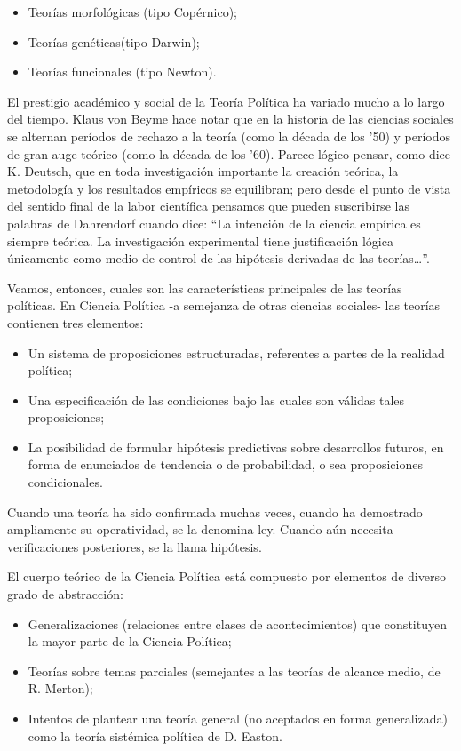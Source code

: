 \documentclass[
]{book}
\providecommand{\tightlist}{%
  \setlength{\itemsep}{0pt}\setlength{\parskip}{0pt}}
\begin{document}
\begin{itemize}
\tightlist
\item
  Teorías morfológicas (tipo Copérnico);
\item
  Teorías genéticas(tipo Darwin);
\item
  Teorías funcionales (tipo Newton).
\end{itemize}

El prestigio académico y social de la Teoría Política ha variado mucho a lo largo del tiempo. Klaus von Beyme hace notar que en la historia de las ciencias sociales se alternan períodos de rechazo a la teoría (como la década de los '50) y períodos de gran auge teórico (como la década de los '60). Parece lógico pensar, como dice K. Deutsch, que en toda investigación importante la creación teórica, la metodología y los resultados empíricos se equilibran; pero desde el punto de vista del sentido final de la labor científica pensamos que pueden suscribirse las palabras de Dahrendorf cuando dice: ``La intención de la ciencia empírica es siempre teórica. La investigación experimental tiene justificación lógica únicamente como medio de control de las hipótesis derivadas de las teorías\ldots{}''.

Veamos, entonces, cuales son las características principales de las teorías políticas. En Ciencia Política -a semejanza de otras ciencias sociales- las teorías contienen tres elementos:

\begin{itemize}
\tightlist
\item
  Un sistema de proposiciones estructuradas, referentes a partes de la realidad política;
\item
  Una especificación de las condiciones bajo las cuales son válidas tales proposiciones;
\item
  La posibilidad de formular hipótesis predictivas sobre desarrollos futuros, en forma de enunciados de tendencia o de probabilidad, o sea proposiciones condicionales.
\end{itemize}

Cuando una teoría ha sido confirmada muchas veces, cuando ha demostrado ampliamente su operatividad, se la denomina ley. Cuando aún necesita verificaciones posteriores, se la llama hipótesis.

El cuerpo teórico de la Ciencia Política está compuesto por elementos de diverso grado de abstracción:

\begin{itemize}
\tightlist
\item
  Generalizaciones (relaciones entre clases de acontecimientos) que constituyen la mayor parte de la Ciencia Política;
\item
  Teorías sobre temas parciales (semejantes a las teorías de alcance medio, de R. Merton);
\item
  Intentos de plantear una teoría general (no aceptados en forma generalizada) como la teoría sistémica política de D. Easton.
\end{itemize}
\end{document}
